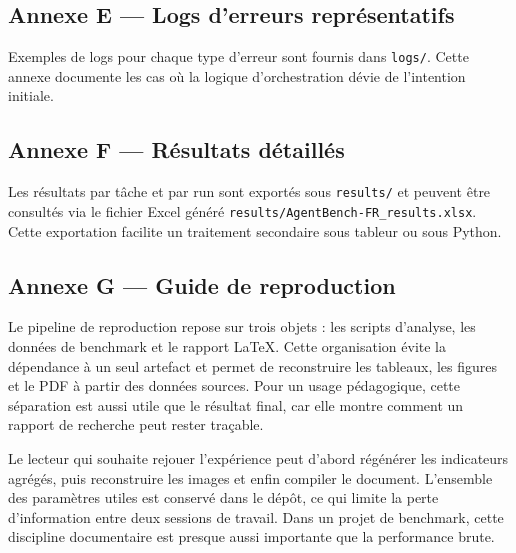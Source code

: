 \documentclass[11pt,a4paper]{article}
\begin{document}
\subsection*{Annexe E — Logs d'erreurs représentatifs}
Exemples de logs pour chaque type d'erreur sont fournis dans \texttt{logs/}. Cette annexe documente les cas où la logique d'orchestration dévie de l'intention initiale.

\subsection*{Annexe F — Résultats détaillés}
Les résultats par tâche et par run sont exportés sous \texttt{results/} et peuvent être consultés via le fichier Excel généré \texttt{results/AgentBench-FR\_results.xlsx}. Cette exportation facilite un traitement secondaire sous tableur ou sous Python.

\subsection*{Annexe G — Guide de reproduction}
Le pipeline de reproduction repose sur trois objets : les scripts d'analyse, les données de benchmark et le rapport LaTeX. Cette organisation évite la dépendance à un seul artefact et permet de reconstruire les tableaux, les figures et le PDF à partir des données sources. Pour un usage pédagogique, cette séparation est aussi utile que le résultat final, car elle montre comment un rapport de recherche peut rester traçable.

Le lecteur qui souhaite rejouer l'expérience peut d'abord régénérer les indicateurs agrégés, puis reconstruire les images et enfin compiler le document. L'ensemble des paramètres utiles est conservé dans le dépôt, ce qui limite la perte d'information entre deux sessions de travail. Dans un projet de benchmark, cette discipline documentaire est presque aussi importante que la performance brute.



\end{document}

